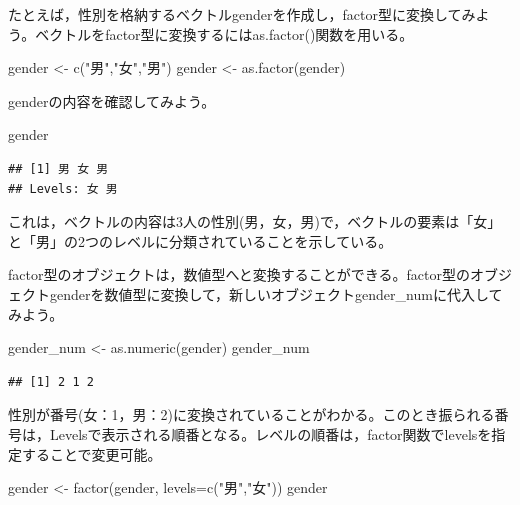 \documentclass[
]{book}
\newenvironment{Shaded}{\begin{snugshade}}{\end{snugshade}}
\newcommand{\AttributeTok}[1]{\textcolor[rgb]{0.77,0.63,0.00}{#1}}
\newcommand{\FunctionTok}[1]{\textcolor[rgb]{0.00,0.00,0.00}{#1}}
\newcommand{\NormalTok}[1]{#1}
\newcommand{\OtherTok}[1]{\textcolor[rgb]{0.56,0.35,0.01}{#1}}
\newcommand{\StringTok}[1]{\textcolor[rgb]{0.31,0.60,0.02}{#1}}
\begin{document}
たとえば，性別を格納するベクトルgenderを作成し，factor型に変換してみよう。ベクトルをfactor型に変換するにはas.factor()関数を用いる。

\begin{Shaded}
\begin{Highlighting}[]
\NormalTok{gender }\OtherTok{\textless{}{-}} \FunctionTok{c}\NormalTok{(}\StringTok{"男"}\NormalTok{,}\StringTok{"女"}\NormalTok{,}\StringTok{"男"}\NormalTok{)}
\NormalTok{gender }\OtherTok{\textless{}{-}} \FunctionTok{as.factor}\NormalTok{(gender)}
\end{Highlighting}
\end{Shaded}

genderの内容を確認してみよう。

\begin{Shaded}
\begin{Highlighting}[]
\NormalTok{gender}
\end{Highlighting}
\end{Shaded}

\begin{verbatim}
## [1] 男 女 男
## Levels: 女 男
\end{verbatim}

これは，ベクトルの内容は3人の性別(男，女，男)で，ベクトルの要素は「女」と「男」の2つのレベルに分類されていることを示している。

factor型のオブジェクトは，数値型へと変換することができる。factor型のオブジェクトgenderを数値型に変換して，新しいオブジェクトgender\_numに代入してみよう。

\begin{Shaded}
\begin{Highlighting}[]
\NormalTok{gender\_num }\OtherTok{\textless{}{-}} \FunctionTok{as.numeric}\NormalTok{(gender)}
\NormalTok{gender\_num}
\end{Highlighting}
\end{Shaded}

\begin{verbatim}
## [1] 2 1 2
\end{verbatim}

性別が番号(女：1，男：2)に変換されていることがわかる。このとき振られる番号は，Levelsで表示される順番となる。レベルの順番は，factor関数でlevelsを指定することで変更可能。

\begin{Shaded}
\begin{Highlighting}[]
\NormalTok{gender }\OtherTok{\textless{}{-}} \FunctionTok{factor}\NormalTok{(gender, }\AttributeTok{levels=}\FunctionTok{c}\NormalTok{(}\StringTok{"男"}\NormalTok{,}\StringTok{"女"}\NormalTok{))}
\NormalTok{gender}
\end{Highlighting}
\end{Shaded}
\end{document}
